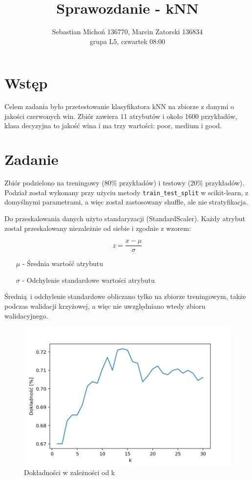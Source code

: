 \documentclass[12pt]{article}
\title{\vspace{-1.5in}Sprawozdanie - kNN}
\author{Sebastian Michoń 136770, Marcin Zatorski 136834\\ grupa L5, czwartek 08:00}
\date{}
\begin{document}
\maketitle

\section{Wstęp}
Celem zadania było przetestowanie klasyfikatora kNN na zbiorze z danymi o jakości czerwonych win. Zbiór zawiera 11 atrybutów i około 1600 przykładów, klasa decyzyjna to jakość wina i ma trzy wartości: poor, medium i good.

\section{Zadanie}

Zbiór podzielono na treningowy (80\% przykładów) i testowy (20\% przykładów). Podział został wykonany przy użyciu metody \texttt{train\_test\_split} w scikit-learn, z domyślnymi parametrami, a więc został zastosowany shuffle, ale nie stratyfikacja.

Do przeskalowania danych użyto standaryzacji (StandardScaler). Każdy atrybut został przeskalowany niezależnie od siebie i zgodnie z wzorem:

\begin{equation}
z = \frac{x - \mu}{\sigma}
\end{equation}
\begin{enumerate}
	\item[$\mu$] - Średnia wartość atrybutu
	\item[$\sigma$] - Odchylenie standardowe wartości atrybutu
\end{enumerate}
Średnią i odchylenie standardowe obliczano tylko na zbiorze treningowym, także podczas walidacji krzyżowej, a więc nie uwzględniano wtedy zbioru walidacyjnego.

\begin{figure}[htb!]
	\centering
	\includegraphics[width=0.7\columnwidth]{accuracy_knn.png}
	\caption{Dokładności w zależności od k}
	\label{fig:accuracy}
\end{figure}
\end{document}
